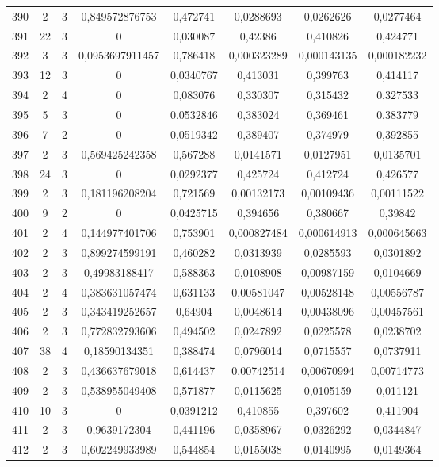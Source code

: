 \begin{longtable}{|c|c|c|c|c|c|c|c|}
390 & 2 & 3 & 0,849572876753 & 0,472741 & 0,0288693 & 0,0262626 & 0,0277464  \\
391 & 22 & 3 & 0 & 0,030087 & 0,42386 & 0,410826 & 0,424771  \\
392 & 3 & 3 & 0,0953697911457 & 0,786418 & 0,000323289 & 0,000143135 & 0,000182232  \\
393 & 12 & 3 & 0 & 0,0340767 & 0,413031 & 0,399763 & 0,414117  \\
394 & 2 & 4 & 0 & 0,083076 & 0,330307 & 0,315432 & 0,327533  \\
395 & 5 & 3 & 0 & 0,0532846 & 0,383024 & 0,369461 & 0,383779  \\
396 & 7 & 2 & 0 & 0,0519342 & 0,389407 & 0,374979 & 0,392855  \\
397 & 2 & 3 & 0,569425242358 & 0,567288 & 0,0141571 & 0,0127951 & 0,0135701  \\
398 & 24 & 3 & 0 & 0,0292377 & 0,425724 & 0,412724 & 0,426577  \\
399 & 2 & 3 & 0,181196208204 & 0,721569 & 0,00132173 & 0,00109436 & 0,00111522  \\
400 & 9 & 2 & 0 & 0,0425715 & 0,394656 & 0,380667 & 0,39842  \\
401 & 2 & 4 & 0,144977401706 & 0,753901 & 0,000827484 & 0,000614913 & 0,000645663  \\
402 & 2 & 3 & 0,899274599191 & 0,460282 & 0,0313939 & 0,0285593 & 0,0301892  \\
403 & 2 & 3 & 0,49983188417 & 0,588363 & 0,0108908 & 0,00987159 & 0,0104669  \\
404 & 2 & 4 & 0,383631057474 & 0,631133 & 0,00581047 & 0,00528148 & 0,00556787  \\
405 & 2 & 3 & 0,343419252657 & 0,64904 & 0,0048614 & 0,00438096 & 0,00457561  \\
406 & 2 & 3 & 0,772832793606 & 0,494502 & 0,0247892 & 0,0225578 & 0,0238702  \\
407 & 38 & 4 & 0,18590134351 & 0,388474 & 0,0796014 & 0,0715557 & 0,0737911  \\
408 & 2 & 3 & 0,436637679018 & 0,614437 & 0,00742514 & 0,00670994 & 0,00714773  \\
409 & 2 & 3 & 0,538955049408 & 0,571877 & 0,0115625 & 0,0105159 & 0,011121  \\
410 & 10 & 3 & 0 & 0,0391212 & 0,410855 & 0,397602 & 0,411904  \\
411 & 2 & 3 & 0,9639172304 & 0,441196 & 0,0358967 & 0,0326292 & 0,0344847  \\
412 & 2 & 3 & 0,602249933989 & 0,544854 & 0,0155038 & 0,0140995 & 0,0149364  \\

\end{longtable}
